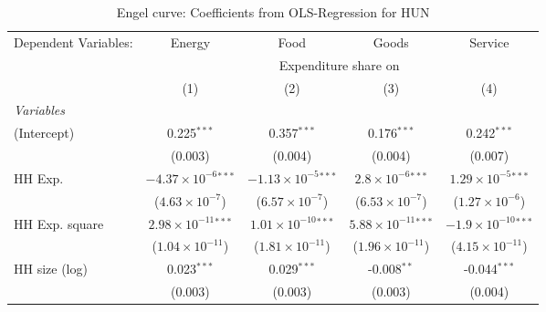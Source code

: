 
\begin{table}[htbp!]
   \centering
   \small
   \begin{adjustbox}{width = 1\textwidth, max height = 0.95\textheight, center}
      \begin{threeparttable}[b]
         \caption{\label{tab:Engel_parametric_HUN} Engel curve: Coefficients from OLS-Regression for HUN}
         \begin{tabular}{lcccc}
            \tabularnewline \midrule \midrule
            Dependent Variables: & Energy                         & Food                           & Goods                          & Service\\  
             & \multicolumn{4}{c}{Expenditure share on} \\ 
                                 & (1)                            & (2)                            & (3)                            & (4)\\  
            \midrule
            \emph{Variables}\\
            (Intercept)          & 0.225$^{***}$                  & 0.357$^{***}$                  & 0.176$^{***}$                  & 0.242$^{***}$\\   
                                 & (0.003)                        & (0.004)                        & (0.004)                        & (0.007)\\   
            HH Exp.              & $-4.37\times 10^{-6}$$^{***}$  & $-1.13\times 10^{-5}$$^{***}$  & $2.8\times 10^{-6}$$^{***}$    & $1.29\times 10^{-5}$$^{***}$\\    
                                 & ($4.63\times 10^{-7}$)         & ($6.57\times 10^{-7}$)         & ($6.53\times 10^{-7}$)         & ($1.27\times 10^{-6}$)\\    
            HH Exp. square       & $2.98\times 10^{-11}$$^{***}$  & $1.01\times 10^{-10}$$^{***}$  & $5.88\times 10^{-11}$$^{***}$  & $-1.9\times 10^{-10}$$^{***}$\\    
                                 & ($1.04\times 10^{-11}$)        & ($1.81\times 10^{-11}$)        & ($1.96\times 10^{-11}$)        & ($4.15\times 10^{-11}$)\\    
            HH size (log)        & 0.023$^{***}$                  & 0.029$^{***}$                  & -0.008$^{**}$                  & -0.044$^{***}$\\   
                                 & (0.003)                        & (0.003)                        & (0.003)                        & (0.004)\\   

\end{tabular}
\end{threeparttable}
\end{adjustbox}
\end{table}
